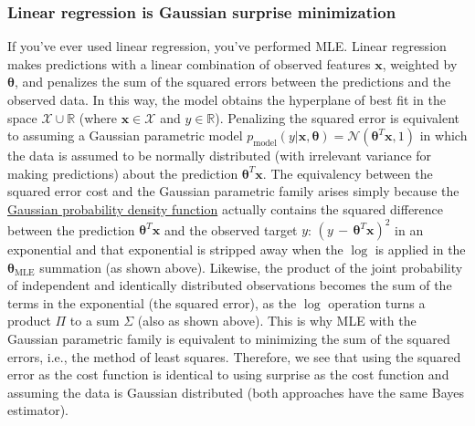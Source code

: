 \documentclass{article}
\begin{document}
\subsubsection*{Linear regression is Gaussian surprise minimization}
If you've ever used linear regression, you've performed MLE. Linear regression makes predictions with a linear combination of observed features $\textbf{x}$, weighted by $\boldsymbol{\theta}$, and penalizes the sum of the squared errors between the predictions and the observed data. In this way, the model obtains the hyperplane of best fit in the space $\mathcal{X} \cup \mathbb{R}$ (where $\textbf{x}\in\mathcal{X}$ and $y\in \mathbb{R}$). Penalizing the squared error is equivalent to assuming a Gaussian parametric model $p_{\mathrm{model}}(y | \textbf{x} , \boldsymbol{\theta}) = \mathcal{N}(\boldsymbol{\theta}^T \textbf{x}, 1)$ in which the data is assumed to be normally distributed (with irrelevant variance for making predictions) about the prediction $\boldsymbol{\theta}^T \textbf{x}$. The equivalency between the squared error cost and the Gaussian parametric family arises simply because the \href{https://en.wikipedia.org/wiki/Normal_distribution}{Gaussian probability density function} actually contains the squared difference between the prediction $\boldsymbol{\theta}^T \textbf{x}$ and the observed target $y$: $(y \, - \, \boldsymbol{\theta}^T\textbf{x})^2$ in an exponential and that exponential is stripped away when the $\log$ is applied in the $\boldsymbol{\theta}_{\mathrm{MLE}}$ summation (as shown above). Likewise, the product of the joint probability of independent and identically distributed observations becomes the sum of the terms in the exponential (the squared error), as the $\log$ operation turns a product $\Pi$ to a sum $\Sigma$ (also as shown above). This is why MLE with the Gaussian parametric family is equivalent to minimizing the sum of the squared errors, i.e., the method of least squares. Therefore, we see that using the squared error as the cost function is identical to using surprise as the cost function and assuming the data is Gaussian distributed (both approaches have the same Bayes estimator). 
\end{document}
